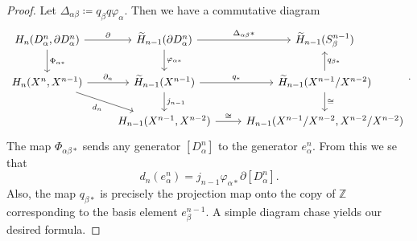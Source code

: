 \documentclass[10pt,letterpaper,cm]{nupset}
\theoremstyle{definition}
\theoremstyle{theorem}
\theoremstyle{remark}
\newcommand{\Z}{\mathbb Z}
\newcommand{\1}{\mathbb{1}}
\newcommand{\0}{\vec 0}
\begin{document}
\begin{proof}
Let $\Delta_{\alpha{\beta}}\coloneqq  q_{\beta}q \varphi_{\alpha}$. Then we have a commutative diagram
\[
\begin{tikzcd}
{H_n(D^n_{\alpha}, \partial{D_{\alpha}^n})} \arrow[d, "\Phi_{\alpha{\ast}}"] \arrow[r, "\partial"] & \widetilde{H}_{n-1}(\partial{D_{\alpha}^n}) \arrow[r, "\Delta_{\alpha{\beta}}{\ast}"] \arrow[d, "\varphi_{\alpha{\ast}}"] & \widetilde{H}_{n-1}(S_{\beta}^{n-1})                                                  \\
{H_n(X^n, X^{n-1})} \arrow[rd, "d_n"'] \arrow[r, "\partial_n"]                                     & \widetilde{H}_{n-1}(X^{n-1}) \arrow[r, "q_{\ast}"] \arrow[d, "j_{n-1}"]                                                   & \widetilde{H}_{n-1}(X^{n-1}/X^{n-2}) \arrow[u, "q_{\beta{\ast}}"'] \arrow[d, "\cong"] \\
                                                                                                   & {H_{n-1}(X^{n-1}, X^{n-2})} \arrow[r, "\cong"]                                                                            & {H_{n-1}(X^{n-1}/X^{n-2}, X^{n-2}/X^{n-2})}                                          
\end{tikzcd}
.\] The map $\Phi_{\alpha{\beta}{\ast}}$ sends any generator $[D_{\alpha}^n]$ to the generator $e_{\alpha}^n$. From this we se that $$  d_n(e_{\alpha}^n) = j_{n-1}\varphi_{\alpha{\ast}}\partial{[D_{\alpha}^n]}  .$$ Also, the map $q_{\beta{\ast}}$ is precisely the projection map onto the copy of $\Z$ corresponding to the basis element $e_{\beta}^{n-1}$. A simple diagram chase yields our desired formula. 
\end{proof}
\end{document}
